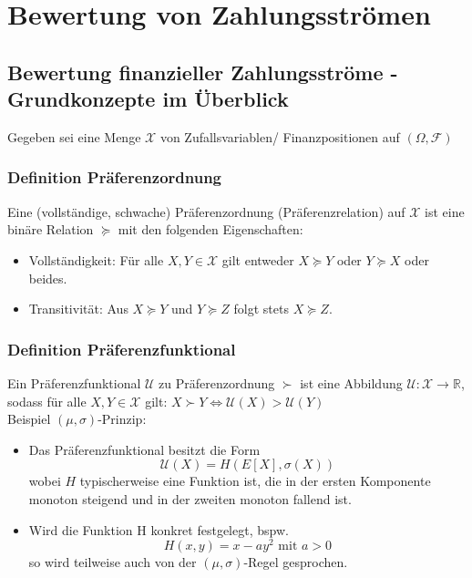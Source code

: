 \documentclass[12pt]{report}
\theoremstyle{dotless}
\theoremstyle{definition}
\begin{document}
\section{Bewertung von Zahlungsströmen}

\subsection{Bewertung finanzieller Zahlungsströme - Grundkonzepte im Überblick}


Gegeben sei eine Menge $\mathcal{X}$ von Zufallsvariablen/ Finanzpositionen auf $(\Omega, \mathcal{F})$

\subsubsection{Definition Präferenzordnung}
Eine (vollständige, schwache) Präferenzordnung (Präferenzrelation) auf $\mathcal{X}$ ist eine binäre Relation $\succeq$ mit den folgenden Eigenschaften:
\begin{itemize}
\item Vollständigkeit: Für alle $X, Y \in \mathcal{X}$ gilt entweder $X \succeq Y$ oder $Y \succeq X$ oder beides.
\item Transitivität: Aus $X \succeq Y$ und $Y \succeq Z$ folgt stets $X \succeq Z$.
\end{itemize}

\subsubsection{Definition Präferenzfunktional}
Ein Präferenzfunktional $\mathcal{U}$ zu Präferenzordnung $\succ$ ist eine Abbildung $\mathcal{U} : \mathcal{X} \rightarrow \mathbb{R}$, sodass für alle $X,Y \in \mathcal{X}$ gilt: $X\succ Y \Leftrightarrow \mathcal{U}(X) > \mathcal{U}(Y)$ \\

Beispiel $(\mu, \sigma)$-Prinzip:
\begin{itemize}
\item Das Präferenzfunktional besitzt die Form
\begin{equation}
\mathcal{U}(X) = H(E[X], \sigma(X))
\end{equation}
wobei $H$ typischerweise eine Funktion ist, die in der ersten Komponente
monoton steigend und in der zweiten monoton fallend ist.
\item Wird die Funktion H konkret festgelegt, bspw.
\begin{equation}
H(x,y) = x-ay^2 \text{ mit } a>0
\end{equation}
so wird teilweise auch von der $(\mu, \sigma)$-Regel gesprochen.
\end{itemize}
\end{document}
